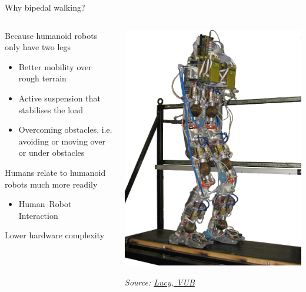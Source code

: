 \documentclass[compress]{beamer}
\newcommand{\source}[2]{{\tiny\it Source: \href{#1}{#2}}}
\begin{document}
\begin{frame}{Why bipedal walking?}
    \begin{columns}
        \begin{column}{0.5\linewidth}

    Because humanoid robots only have two legs

    \begin{itemize}

        \item Better mobility over rough terrain
        \item Active suspension that stabilises the load
        \item Overcoming obstacles, i.e. avoiding or moving over or under obstacles
    \end{itemize}

    Humans relate to humanoid robots much more readily

    \begin{itemize}

        \item Human--Robot Interaction
    \end{itemize}
    
    Lower hardware complexity

        \end{column}
        \begin{column}{0.5\linewidth}
            \begin{center}
                \includegraphics[width=0.8\linewidth]{lucy}

    \source{http://lucy.vub.ac.be/}{Lucy, VUB}
            \end{center}
        \end{column}
    \end{columns}

\end{frame}
\end{document}
